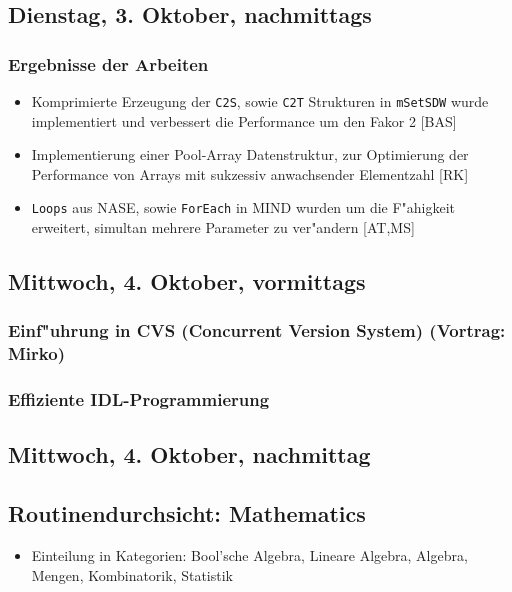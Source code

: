 \documentclass[12pt]{article}
\begin{document}
\subsection{Dienstag, 3. Oktober, nachmittags}

\subsubsection{Ergebnisse der Arbeiten}
\begin{itemize}
\item Komprimierte Erzeugung der \texttt{C2S}, sowie \texttt{C2T} Strukturen in \texttt{mSetSDW} wurde implementiert und
      verbessert die Performance um den Fakor 2 [BAS]
\item Implementierung einer Pool-Array Datenstruktur, zur Optimierung der Performance von  Arrays mit sukzessiv anwachsender Elementzahl [RK] 
\item \texttt{Loops} aus NASE, sowie \texttt{ForEach} in MIND wurden um die F"ahigkeit erweitert, simultan mehrere Parameter zu ver"andern [AT,MS]
\end{itemize}


\subsection{Mittwoch, 4. Oktober, vormittags}

\subsubsection{Einf"uhrung in CVS (Concurrent Version System) (Vortrag: Mirko)}
\subsubsection{Effiziente IDL-Programmierung}


\subsection{Mittwoch, 4. Oktober, nachmittag}

\subsection{Routinendurchsicht: Mathematics}
\begin{itemize}
\item Einteilung in Kategorien: Bool'sche Algebra, Lineare Algebra, Algebra, Mengen, Kombinatorik, Statistik
\end{itemize}
\end{document}
